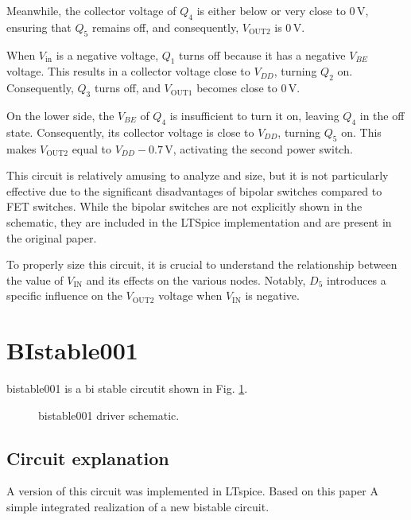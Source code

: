 \documentclass[12pt]{article}
\begin{document}
Meanwhile, the collector voltage of $Q_4$ is either below or very close to $0 \, \text{V}$, ensuring that $Q_5$ remains off, and consequently, $V_{\text{OUT2}}$ is $0 \, \text{V}$.  

When $V_{\text{in}}$ is a negative voltage, $Q_1$ turns off because it has a negative $V_{BE}$ voltage. This results in a collector voltage close to $V_{DD}$, turning $Q_2$ on. Consequently, $Q_3$ turns off, and $V_{\text{OUT1}}$ becomes close to $0 \, \text{V}$.  

On the lower side, the $V_{BE}$ of $Q_4$ is insufficient to turn it on, leaving $Q_4$ in the off state. Consequently, its collector voltage is close to $V_{DD}$, turning $Q_5$ on. This makes $V_{\text{OUT2}}$ equal to $V_{DD} - 0.7 \, \text{V}$, activating the second power switch.

This circuit is relatively amusing to analyze and size, but it is not particularly effective due to the significant disadvantages of bipolar switches compared to FET switches. While the bipolar switches are not explicitly shown in the schematic, they are included in the LTSpice implementation and are present in the original paper.  

To properly size this circuit, it is crucial to understand the relationship between the value of $V_{\text{IN}}$ and its effects on the various nodes. Notably, $D_5$ introduces a specific influence on the $V_{\text{OUT2}}$ voltage when $V_{\text{IN}}$ is negative.  


\newpage


\section{BIstable001}



bistable001 is a bi stable circutit shown in Fig. \ref{bistable001}. 

\begin{figure}[H]
        \centering
        
        \caption{bistable001 driver schematic.}
        \label{bistable001}
\end{figure}

\subsection{Circuit explanation}

A version of this circuit was implemented in LTspice.  
Based on this paper A simple integrated realization of a new bistable circuit.
\end{document}
